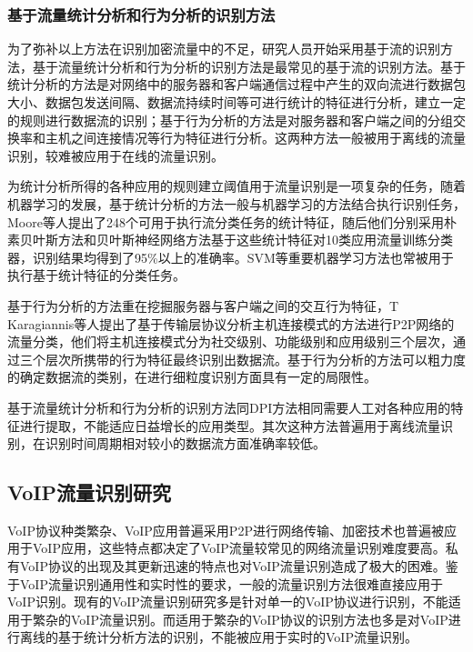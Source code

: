 \subsubsection{基于流量统计分析和行为分析的识别方法}
为了弥补以上方法在识别加密流量中的不足，研究人员开始采用基于流的识别方法，基于流量统计分析和行为分析的识别方法是最常见的基于流的识别方法。基于统计分析的方法是对网络中的服务器和客户端通信过程中产生的双向流进行数据包大小、数据包发送间隔、数据流持续时间等可进行统计的特征进行分析，建立一定的规则进行数据流的识别；基于行为分析的方法是对服务器和客户端之间的分组交换率和主机之间连接情况等行为特征进行分析。这两种方法一般被用于离线的流量识别，较难被应用于在线的流量识别。

为统计分析所得的各种应用的规则建立阈值用于流量识别是一项复杂的任务，随着机器学习的发展，基于统计分析的方法一般与机器学习的方法结合执行识别任务，Moore等人提出了248个可用于执行流分类任务的统计特征\supercite{statistic1}，随后他们分别采用朴素贝叶斯方法和贝叶斯神经网络方法基于这些统计特征对10类应用流量训练分类器\supercite{statistic2,statistic3}，识别结果均得到了95\%以上的准确率。SVM等重要机器学习方法也常被用于执行基于统计特征的分类任务\supercite{statistic4,statistic5}。

基于行为分析的方法重在挖掘服务器与客户端之间的交互行为特征，T Karagiannis等人提出了基于传输层协议分析主机连接模式的方法进行P2P网络的流量分类，他们将主机连接模式分为社交级别、功能级别和应用级别三个层次，通过三个层次所携带的行为特征最终识别出数据流\supercite{behavior1,behavior2}。基于行为分析的方法可以粗力度的确定数据流的类别，在进行细粒度识别方面具有一定的局限性。

基于流量统计分析和行为分析的识别方法同DPI方法相同需要人工对各种应用的特征进行提取，不能适应日益增长的应用类型。其次这种方法普遍用于离线流量识别，在识别时间周期相对较小的数据流方面准确率较低。



\subsection{VoIP流量识别研究}
VoIP协议种类繁杂、VoIP应用普遍采用P2P进行网络传输、加密技术也普遍被应用于VoIP应用，这些特点都决定了VoIP流量较常见的网络流量识别难度要高。私有VoIP协议的出现及其更新迅速的特点也对VoIP流量识别造成了极大的困难。鉴于VoIP流量识别通用性和实时性的要求，一般的流量识别方法很难直接应用于VoIP识别。现有的VoIP流量识别研究多是针对单一的VoIP协议进行识别，不能适用于繁杂的VoIP流量识别。而适用于繁杂的VoIP协议的识别方法也多是对VoIP进行离线的基于统计分析方法的识别，不能被应用于实时的VoIP流量识别。

